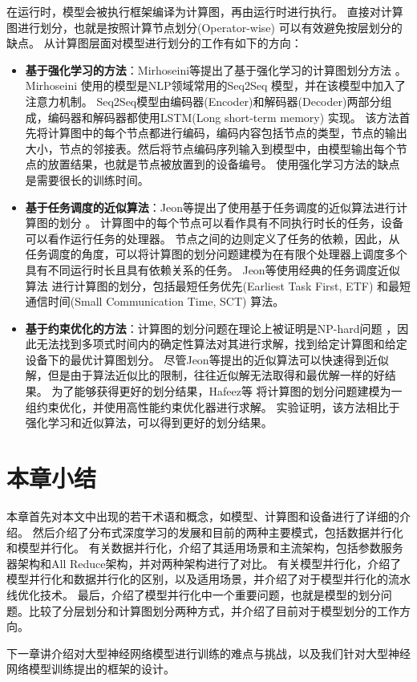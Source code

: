 在运行时，模型会被执行框架编译为计算图，再由运行时进行执行。
直接对计算图进行划分，也就是按照计算节点划分(Operator-wise) 可以有效避免按层划分的缺点。
从计算图层面对模型进行划分的工作有如下的方向：
\begin{itemize}
	\item \textbf{基于强化学习的方法}：Mirhoseini等提出了基于强化学习的计算图划分方法 。
	Mirhoseini 使用的模型是NLP领域常用的Seq2Seq 模型，并在该模型中加入了注意力机制。
	Seq2Seq模型由编码器(Encoder)和解码器(Decoder)两部分组成，编码器和解码器都使用LSTM(Long short-term memory) 实现。
	该方法首先将计算图中的每个节点都进行编码，编码内容包括节点的类型，节点的输出大小，节点的邻接表。然后将节点编码序列输入到模型中，由模型输出每个节点的放置结果，也就是节点被放置到的设备编号。
	使用强化学习方法的缺点是需要很长的训练时间。
	\item \textbf{基于任务调度的近似算法}：Jeon等提出了使用基于任务调度的近似算法进行计算图的划分 。
	计算图中的每个节点可以看作具有不同执行时长的任务，设备可以看作运行任务的处理器。
	节点之间的边则定义了任务的依赖，因此，从任务调度的角度，可以将计算图的划分问题建模为在有限个处理器上调度多个具有不同运行时长且具有依赖关系的任务。
	Jeon等使用经典的任务调度近似算法 进行计算图的划分，包括最短任务优先(Earliest Task First, ETF) 和最短通信时间(Small Communication Time, SCT) 算法。
	\item \textbf{基于约束优化的方法}：计算图的划分问题在理论上被证明是NP-hard问题 ，因此无法找到多项式时间内的确定性算法对其进行求解，找到给定计算图和给定设备下的最优计算图划分。
	尽管Jeon等提出的近似算法可以快速得到近似解，但是由于算法近似比的限制，往往近似解无法取得和最优解一样的好结果。
	为了能够获得更好的划分结果，Hafeez等 将计算图的划分问题建模为一组约束优化，并使用高性能约束优化器进行求解。
	实验证明，该方法相比于强化学习和近似算法，可以得到更好的划分结果。

\end{itemize}

\section{本章小结}

本章首先对本文中出现的若干术语和概念，如模型、计算图和设备进行了详细的介绍。
然后介绍了分布式深度学习的发展和目前的两种主要模式，包括数据并行化和模型并行化。
有关数据并行化，介绍了其适用场景和主流架构，包括参数服务器架构和All Reduce架构，并对两种架构进行了对比。
有关模型并行化，介绍了模型并行化和数据并行化的区别，以及适用场景，并介绍了对于模型并行化的流水线优化技术。
最后，介绍了模型并行化中一个重要问题，也就是模型的划分问题。比较了分层划分和计算图划分两种方式，并介绍了目前对于模型划分的工作方向。

下一章讲介绍对大型神经网络模型进行训练的难点与挑战，以及我们针对大型神经网络模型训练提出的\sys{}框架的设计。 